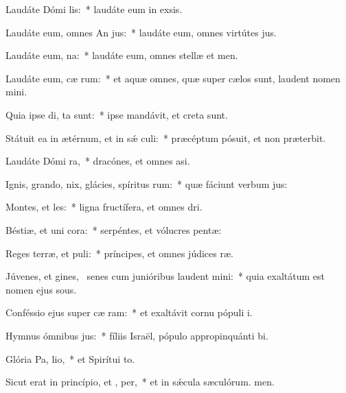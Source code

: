\item Laudáte Dómi  lis:~* laudáte eum in exsis.
\item Laudáte eum, omnes An jus:~* laudáte eum, omnes virtútes jus.
\item Laudáte eum,   na:~* laudáte eum, omnes stellæ et men.
\item Laudáte eum, cæ rum:~* et aquæ omnes, quæ super cælos sunt, laudent nomen mini.
\item Quia ipse di,  ta sunt:~* ipse mandávit, et creta sunt.
\item Státuit ea in ætérnum, et in sǽ culi:~* præcéptum pósuit, et non præterbit.
\item Laudáte Dómi  ra,~* dracónes, et omnes asi.
\item Ignis, grando, nix, glácies, spíritus rum:~* quæ fáciunt verbum jus:
\item Montes, et  les:~* ligna fructífera, et omnes dri.
\item Béstiæ, et uni cora:~* serpéntes, et vólucres pentæ:
\item Reges terræ, et  puli:~* príncipes, et omnes júdices ræ.
\item Júvenes, et gines,~\pscross{} senes cum junióribus laudent  mini:~* quia exaltátum est nomen ejus sous.
\item Conféssio ejus super cæ  ram:~* et exaltávit cornu pópuli i.
\item Hymnus ómnibus  jus:~* fíliis Israël, pópulo appropinquánti bi.
\item Glória Pa,  lio,~* et Spirítui to.
\item Sicut erat in princípio, et ,  per,~* et in sǽcula sæculórum. men.
